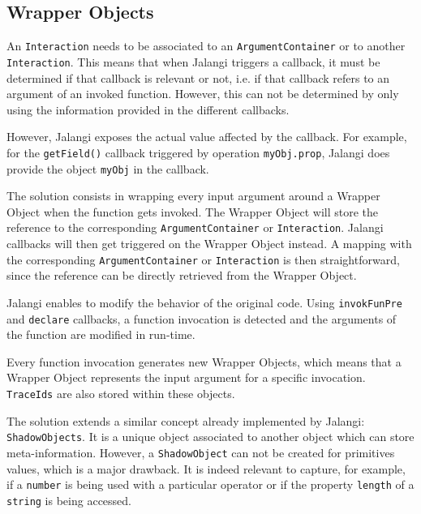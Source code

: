 


\subsection{Wrapper Objects} \label{sec:run-time-wrapper-objects}
An \texttt{Interaction} needs to be associated to an \texttt{ArgumentContainer} or to another \texttt{Interaction}. This means that when Jalangi triggers a callback, it must be determined if that callback is relevant or not, i.e. if that callback refers to an argument of an invoked function. However, this can not be determined by only using the information provided in the different callbacks.

However, Jalangi exposes the actual value affected by the callback. For example, for the \texttt{getField()} callback triggered by operation \texttt{myObj.prop}, Jalangi does provide the object \texttt{myObj} in the callback.

The solution consists in wrapping every input argument around a Wrapper Object when the function gets invoked. The Wrapper Object will store the reference to the corresponding \texttt{ArgumentContainer} or \texttt{Interaction}. Jalangi callbacks will then get triggered on the Wrapper Object instead. A mapping with the corresponding \texttt{ArgumentContainer} or \texttt{Interaction} is then straightforward, since the reference can be directly retrieved from the Wrapper Object.

Jalangi enables to modify the behavior of the original code. Using \texttt{invokFunPre} and \texttt{declare} callbacks, a function invocation is detected and the arguments of the function are modified in run-time.

Every function invocation generates new Wrapper Objects, which means that a Wrapper Object represents the input argument for a specific invocation. \texttt{TraceIds} are also stored within these objects.

The solution extends a similar concept already implemented by Jalangi: \texttt{ShadowObjects}. It is a unique object associated to another object which can store meta-information. However, a \texttt{ShadowObject} can not be created for primitives values, which is a major drawback. It is indeed relevant to capture, for example, if a \texttt{number} is being used with a particular operator or if the property \texttt{length} of a \texttt{string} is being accessed.

